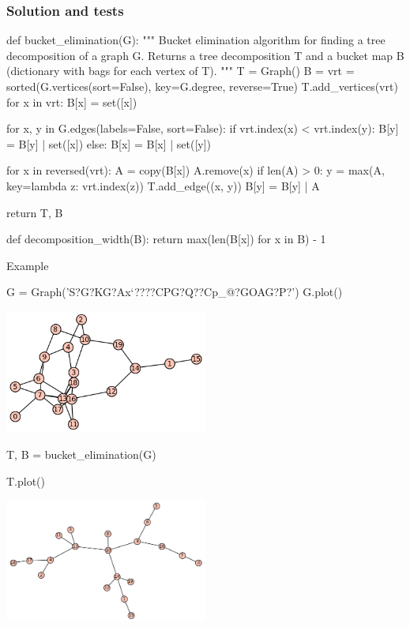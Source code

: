 \subsubsection*{Solution and tests}
\begin{sageCell}
def bucket_elimination(G):
    """
    Bucket elimination algorithm for finding a tree decomposition of a graph G.
    Returns a tree decomposition T and a bucket map B (dictionary with bags for each vertex of T).
    """
    T = Graph()
    B = {}
    vrt = sorted(G.vertices(sort=False), key=G.degree, reverse=True)
    T.add_vertices(vrt)
    for x in vrt:
        B[x] = set([x])

    for x, y in G.edges(labels=False, sort=False):
        if vrt.index(x) < vrt.index(y):
            B[y] = B[y] | set([x])
        else:
            B[x] = B[x] | set([y])

    for x in reversed(vrt):
        A = copy(B[x])
        A.remove(x)
        if len(A) > 0:
            y = max(A, key=lambda z: vrt.index(z))
            T.add_edge((x, y))
            B[y] = B[y] | A

    return T, B
\end{sageCell}

\begin{sageCell}
def decomposition_width(B):
    return max(len(B[x]) for x in B) - 1
\end{sageCell}
Example
\begin{sageCell}
    G = Graph('S?G?KG?Ax`????CPG?Q??Cp_@?GOAG?P?')
    G.plot()
\end{sageCell}
\begin{outImage}
    \includegraphics[width=0.5\textwidth]{Images/TreeDecomposition/bucket_elimination_graph.png}
\end{outImage}

\begin{sageCell}
    T, B = bucket_elimination(G)
\end{sageCell}
\begin{sageCell}
    T.plot()
\end{sageCell}
\begin{outImage}
   \includegraphics[width=0.5\textwidth]{Images/TreeDecomposition/bucket_elimination.png}
\end{outImage}

